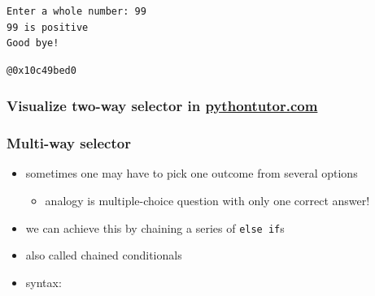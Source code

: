 \documentclass[11pt]{article}
\makeatletter
\providecommand{\tightlist}{%
      \setlength{\itemsep}{0pt}\setlength{\parskip}{0pt}}
\newcommand{\boxspacing}{\kern\kvtcb@left@rule\kern\kvtcb@boxsep}
\newcommand{\prompt}[4]{
        {\ttfamily\llap{{\color{#2}[#3]:\hspace{3pt}#4}}\vspace{-\baselineskip}}
    }
\makeatother
\begin{document}
    \begin{Verbatim}[commandchars=\\\{\}]
Enter a whole number: 99
99 is positive
Good bye!
    \end{Verbatim}

            \begin{tcolorbox}[breakable, size=fbox, boxrule=.5pt, pad at break*=1mm, opacityfill=0]
\prompt{Out}{outcolor}{14}{\boxspacing}
\begin{Verbatim}[commandchars=\\\{\}]
@0x10c49bed0
\end{Verbatim}
\end{tcolorbox}
        
    \hypertarget{visualize-two-way-selector-in-pythontutor.com}{%
\subsubsection{\texorpdfstring{Visualize two-way selector in
\href{http://pythontutor.com/cpp.html\#code=\%23include\%20\%3Ciostream\%3E\%0Ausing\%20namespace\%20std\%3B\%0A\%0Aint\%20main\%28\%29\%20\%7B\%0A\%20\%20int\%20num1\%20\%3D\%20100\%3B\%0A\%20\%20int\%20num2\%20\%3D\%20200\%3B\%0A\%20\%20if\%20\%28num1\%20\%3E\%3D\%20num2\%29\%0A\%20\%20\%20\%20cout\%20\%3C\%3C\%20num1\%20\%3C\%3C\%20\%22\%20is\%20greater\%20than\%20or\%20equal\%20to\%20\%22\%20\%3C\%3C\%20num2\%20\%3C\%3C\%20endl\%3B\%0A\%20\%20else\%0A\%20\%20\%20\%20cout\%20\%3C\%3C\%20num2\%20\%3C\%3C\%20\%22\%20is\%20greater\%20than\%20\%22\%20\%3C\%3C\%20num1\%20\%3C\%3C\%20endl\%3B\%0A\%20\%20\%20\%20\%0A\%20\%20cout\%20\%3C\%3C\%20\%22Good\%20Bye!\%22\%3B\%0A\%20\%20return\%200\%3B\%0A\%7D\&curInstr=0\&mode=display\&origin=opt-frontend.js\&py=cpp\&rawInputLstJSON=\%5B\%5D}{pythontutor.com}}{Visualize two-way selector in pythontutor.com}}\label{visualize-two-way-selector-in-pythontutor.com}}

\hypertarget{multi-way-selector}{%
\subsubsection{Multi-way selector}\label{multi-way-selector}}

\begin{itemize}
\tightlist
\item
  sometimes one may have to pick one outcome from several options

  \begin{itemize}
  \tightlist
  \item
    analogy is multiple-choice question with only one correct answer!
  \end{itemize}
\item
  we can achieve this by chaining a series of \texttt{else\ if}s
\item
  also called chained conditionals
\item
  syntax:
\end{itemize}
\end{document}
